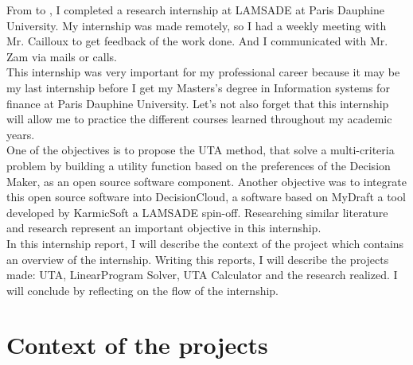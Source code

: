\documentclass{report}
\begin{document}
From  to , I completed a research internship at LAMSADE at Paris Dauphine University. My internship was made remotely, so I had a weekly meeting with Mr. Cailloux to get feedback of the work done. And I communicated with Mr. Zam via mails or calls. \\

This internship was very important for my professional career because it may be my last internship before I get my Masters's degree in Information systems for finance at Paris Dauphine University. Let's not also forget that this internship will allow me to practice the different courses learned throughout my academic years.\\

One of the objectives is to propose the UTA method, that solve a multi-criteria problem by building a utility function based on the preferences of the Decision Maker, as an open source software component. Another objective was to integrate this open source software into DecisionCloud, a software based on MyDraft a tool developed by KarmicSoft a LAMSADE spin-off. Researching similar literature and research represent an important objective in this internship. \\

In this internship report, I will describe the context of the project which contains an overview of the internship. Writing this reports, I will describe the projects made: UTA, LinearProgram Solver, UTA Calculator and the research realized. I will conclude by reflecting on the flow of the internship. \\

\chapter{Context of the projects}
\end{document}
